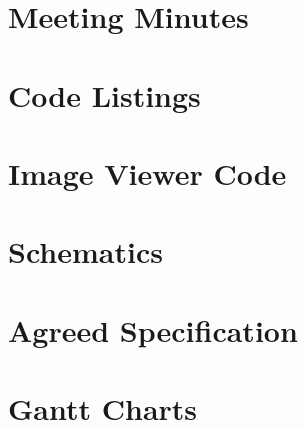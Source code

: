 \documentclass[oneside]{ecsgdp}         %
\begin{document}



\newpage

\appendix
\chapter{Meeting Minutes}

\newpage

\chapter{Code Listings}

\newpage
\chapter{Image Viewer Code}

\newpage

\newpage
\chapter{Schematics}


\newpage

\chapter{Agreed Specification}

\newpage

\chapter{Gantt Charts}

\newpage

\backmatter



\end{document}

